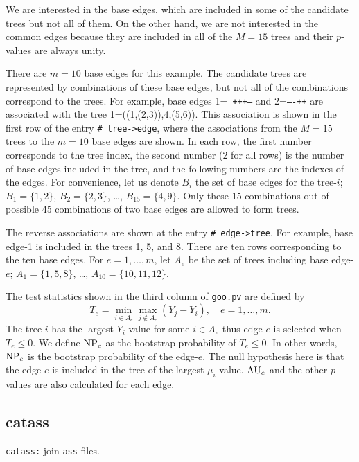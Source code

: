 \documentclass[12pt]{article}
\begin{document}
We are interested in the base edges, which are included in some of the
candidate trees but not all of them. On the other hand, we are not
interested in the common edges because they are included in all of the
$M=15$ trees and their $p$-values are always unity.

There are $m=10$ base edges for this example. The candidate trees are
represented by combinations of these base edges, but not all of the
combinations correspond to the trees. For example, base edges 1={\tt
+++---} and 2={\tt ----++} are associated with the tree
1=((1,(2,3)),4,(5,6)). This association is shown in the first row of the
entry {\tt \# tree->edge}, where the associations from the $M=15$ trees
to the $m=10$ base edges are shown.  In each row, the first number
corresponds to the tree index, the second number (2 for all rows) is the
number of base edges included in the tree, and the following numbers are
the indexes of the edges. For convenience, let us denote $B_i$ the set
of base edges for the tree-$i$; $B_1 = \{1,2\}$, $B_2=\{ 2,3\}$, \ldots,
$B_{15}=\{4,9\}$. Only these 15 combinations out of possible 45
combinations of two base edges are allowed to form trees.

The reverse associations are shown at the entry {\tt \# edge->tree}. For
example, base edge-1 is included in the trees 1, 5, and 8. There are ten
rows corresponding to the ten base edges. For $e=1,\ldots,m$, let $A_e$
be the set of trees including base edge-$e$; $A_1=\{1,5,8\}$, \ldots,
$A_{10}=\{10,11,12\}$.

The test statistics shown in the third column of {\tt goo.pv} are
defined by
\begin{equation}
 T_e =  \min_{i\in A_e} \max_{j\not\in A_e} (Y_j-Y_i),
\quad e=1,\ldots,m.\label{eq:si}
\end{equation}
The tree-$i$ has the largest $Y_i$ value for some $i\in A_e$ thus
edge-$e$ is selected when $T_e\le0$.  We define ${\rm NP}_e$ as the
bootstrap probability of $T_e\le0$. In other words, ${\rm NP}_e$ is the
bootstrap probability of the edge-$e$.  The null hypothesis here is that
the edge-$e$ is included in the tree of the largest $\mu_i$ value.
${\rm AU}_e$ and the other $p$-values are also calculated for each edge.


\subsection{catass}

{\tt catass:} join {\tt ass} files.
\end{document}
